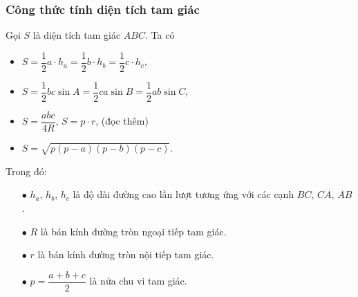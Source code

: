 \subsubsection{Công thức tính diện tích tam giác}
Gọi $S$ là diện tích tam giác $ABC$. Ta có
\begin{itemize}
	\item $S=\dfrac{1}{2}a\cdot h_a=\dfrac{1}{2}b\cdot h_b=\dfrac{1}{2}c\cdot h_c$,
	\item $S=\dfrac{1}{2}bc\sin A=\dfrac{1}{2}ca\sin B=\dfrac{1}{2}ab\sin C$,
	\item $S=\dfrac{abc}{4R}$, $S=p\cdot r$, (đọc thêm)
	\item $S=\sqrt{p(p-a)(p-b)(p-c)}$.
\end{itemize}
Trong đó:
\begin{itemize}
	\item [$\bullet$] $ h_a$, $h_b$, $h_c$ là độ dài đường cao lần lượt tương ứng với các cạnh $ BC$, $CA$, $AB$.
	\item [$\bullet$] $ R$ là bán kính đường tròn ngoại tiếp tam giác.
	\item [$\bullet$] $ r$ là bán kính đường tròn nội tiếp tam giác.
	\item [$\bullet$] $ p=\dfrac{a+b+c}{2}$ là nửa chu vi tam giác.
\end{itemize}

